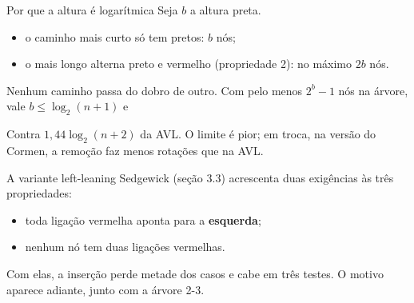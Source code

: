 \documentclass{beamer}
\begin{document}
\begin{frame}{Por que a altura é logarítmica}
	Seja $b$ a altura preta.

	\vspace{0.3cm}
	\begin{itemize}
		\item o caminho mais curto só tem pretos: $b$ nós;
		\item o mais longo alterna preto e vermelho (propriedade 2): no máximo
		      $2b$ nós.
	\end{itemize}

	\vspace{0.3cm}
	Nenhum caminho passa do dobro de outro. Com pelo menos $2^b - 1$ nós na
	árvore, vale $b \le \log_2(n+1)$ e

	\vspace{0.2cm}
	\begin{center}
	\end{center}

	\vspace{0.3cm}
	Contra $1{,}44\log_2(n+2)$ da AVL. O limite é pior; em troca, na versão do
	Cormen, a remoção faz menos rotações que na AVL.
\end{frame}

\begin{frame}{A variante left-leaning}
	Sedgewick (seção 3.3) acrescenta duas exigências às três propriedades:

	\vspace{0.3cm}
	\begin{itemize}
		\item toda ligação vermelha aponta para a \textbf{esquerda};
		\item nenhum nó tem duas ligações vermelhas.
	\end{itemize}

	\vspace{0.3cm}
	Com elas, a inserção perde metade dos casos e cabe em três testes. O motivo
	aparece adiante, junto com a árvore 2-3.
\end{frame}
\end{document}

